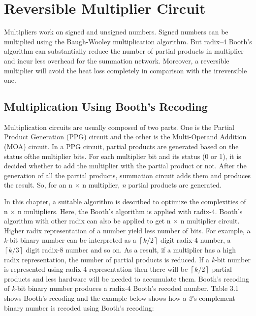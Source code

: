 

\renewcommand{\shortchaptertitle}{Reversible Multiplier Circuit}
\chapter{Reversible Multiplier Circuit}
\label{ch:chapter3}

Multipliers work on signed and unsigned numbers. Signed numbers can be multiplied using the Baugh-Wooley multiplication algorithm. But radix--4 Booth's algorithm can substantially reduce the number of partial products in multiplier and incur less overhead for the summation network. Moreover, a reversible multiplier will avoid the heat loss completely in comparison with the irreversible one.

\section{Multiplication Using Booth's Recoding}

Multiplication circuits are usually composed of two parts. One is the Partial Product Generation (PPG) circuit and the other is the Multi-Operand Addition (MOA) circuit. In a PPG circuit, partial products are generated based on the status ofthe multiplier bits. For each multiplier bit and its status (0 or 1), it is decided whether to add the multiplier with the partial product or not. After the generation of all the partial products, summation circuit adds them and produces the result. So, for an {n $\times$ n} multiplier, \textit{n} partial products are generated.

In this chapter, a suitable algorithm is described to optimize the complexities of {n $\times$ n} multipliers. Here, the Booth's algorithm is applied with radix-4. Booth's algorithm with other radix can also be applied to get {n $\times$ n} multiplier circuit. Higher radix representation of a number yield less number of bits. For example, a \textit{k}-bit binary number can be interpreted as a  $\left\lceil k/2\right\rceil $ digit radix-4 number, a $\left\lceil k/3\right\rceil $  digit radix-8 number and so on. As a result, if a multiplier has a high radix representation, the number of partial products is reduced. If a \textit{k}-bit number is represented using radix-4 representation then there will be $\left\lceil k/2\right\rceil $  partial products and less hardware will be needed to accumulate them. Booth's recoding of \textit{k}-bit binary number produces a radix-4 Booth's recoded number. Table 3.1 shows Booth's recoding and the example below shows how a \textit{2}'s complement binary number is recoded using Booth's recoding:

